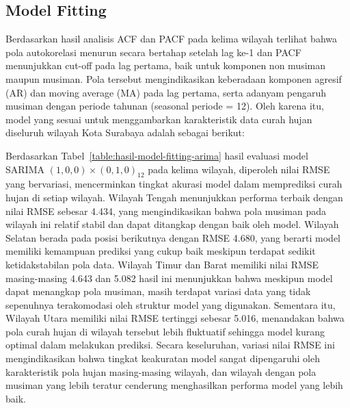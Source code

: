 \subsection{Model Fitting}
Berdasarkan hasil analisis ACF dan PACF pada kelima wilayah terlihat bahwa pola autokorelasi menurun secara bertahap setelah lag ke-1 dan PACF menunjukkan cut-off pada lag pertama, baik untuk komponen non musiman maupun musiman.
Pola tersebut mengindikasikan keberadaan komponen agresif (AR) dan moving average (MA) pada lag pertama, serta adanyam pengaruh musiman dengan periode tahunan (seasonal periode = 12).
Oleh karena itu, model yang sesuai untuk menggambarkan karakteristik data curah hujan diseluruh wilayah Kota Surabaya adalah sebagai berikut:

Berdasarkan Tabel~\ref{table:hasil-model-fitting-arima} hasil evaluasi model SARIMA $(1,0,0) \times (0,1,0)_{12}$ pada kelima wilayah, diperoleh nilai RMSE yang bervariasi, mencerminkan tingkat akurasi model dalam memprediksi curah hujan di setiap wilayah.
Wilayah Tengah menunjukkan performa terbaik dengan nilai RMSE sebesar 4.434, yang mengindikasikan bahwa pola musiman pada wilayah ini relatif stabil dan dapat ditangkap dengan baik oleh model.
Wilayah Selatan berada pada posisi berikutnya dengan RMSE 4.680, yang berarti model memiliki kemampuan prediksi yang cukup baik meskipun terdapat sedikit ketidakstabilan pola data.
Wilayah Timur dan Barat memiliki nilai RMSE masing-masing 4.643 dan 5.082 hasil ini menunjukkan bahwa meskipun model dapat menangkap pola musiman, masih terdapat variasi data yang tidak sepenuhnya terakomodasi oleh struktur model yang digunakan.
Sementara itu, Wilayah Utara memiliki nilai RMSE tertinggi sebesar 5.016, menandakan bahwa pola curah hujan di wilayah tersebut lebih fluktuatif sehingga model kurang optimal dalam melakukan prediksi.
Secara keseluruhan, variasi nilai RMSE ini mengindikasikan bahwa tingkat keakuratan model sangat dipengaruhi oleh karakteristik pola hujan masing-masing wilayah, dan wilayah dengan pola musiman yang lebih teratur cenderung menghasilkan performa model yang lebih baik.

